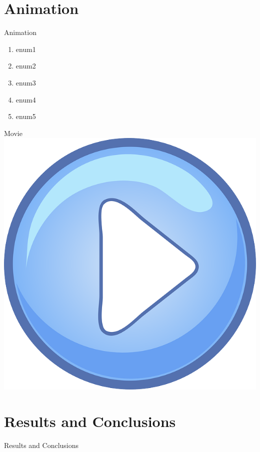 \documentclass[12pt]{beamer}
\begin{document}
\section{Animation}
\begin{frame}{Animation}
\begin{enumerate}
\item {} { enum1}
\item {} {enum2}
\item {} { enum3}
\item {} {enum4}
\item {} { enum5}
\end{enumerate}
\end{frame}


\begin{frame}{Movie}
\centering
\href{run:an.avi}{\includegraphics[scale=.1]{play.png}}
\end{frame}


\section{Results and Conclusions}
\begin{frame}{Results and Conclusions}
\scriptsize\lipsum[1]
\end{frame}
\end{document}
